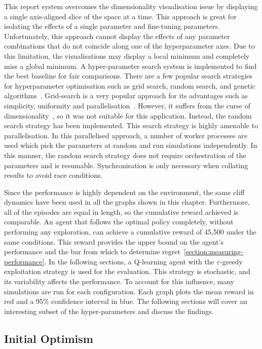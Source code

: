 \documentclass[]{final_report}
\begin{document}
This report system overcomes the dimensionality visualisation issue by displaying a single axis-aligned slice of the space at a time. This approach is great for isolating the effects of a single parameter and fine-tuning parameters. Unfortunately, this approach cannot display the effects of any parameter combinations that do not coincide along one of the hyperparameter axes. Due to this limitation, the visualisations may display a local minimum and completely miss a global minimum. 
\newpage
A hyper-parameter search system is implemented to find the best baseline for fair comparisons. There are a few popular search strategies for hyperparameter optimisation such as grid search, random search, and genetic algorithms~\cite{searchStrategies}. Grid-search is a very popular approach for its advantages such as simplicity, uniformity and parallelisation~\cite{searchStrategies}. However, it suffers from the curse of dimensionality~\cite{searchStrategies}, so it was not suitable for this application. Instead, the random search strategy has been implemented. This search strategy is highly amenable to parallelisation. In this parallelised approach, a number of worker processes are used which pick the parameters at random and run simulations independently. In this manner, the random search strategy does not require orchestration of the parameters and is resumable. Synchronisation is only necessary when collating results to avoid race conditions.

Since the performance is highly dependent on the environment, the same cliff dynamics have been used in all the graphs shown in this chapter. Furthermore, all of the episodes are equal in length, so the cumulative reward achieved is comparable. An agent that follows the optimal policy completely, without performing any exploration, can achieve a cumulative reward of 45,500 under the same conditions. This reward provides the upper bound on the agent's performance and the bar from which to determine regret~\ref{section:measuring-performance}. In the following sections, a Q-learning agent with the $\varepsilon$-greedy exploitation strategy is used for the evaluation. This strategy is stochastic, and its variability affects the performance. To account for this influence, many simulations are run for each configuration. Each graph plots the mean reward in red and a 95\% confidence interval in blue. The following sections will cover an interesting subset of the hyper-parameters and discuss the findings.


\subsection{Initial Optimism}
\end{document}

